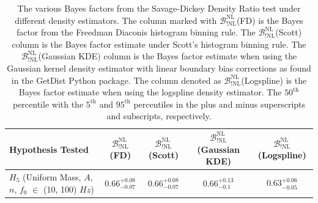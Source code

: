 \newpage
\begin{table}[ht]
\begin{adjustbox}{angle=90}
\begin{tabularx}{1.0\textwidth}{l c c c c}
\hline\hline
 Hypothesis Tested  & $\mathcal{B}^{\mathrm{NL}}_{\mathrm{!NL}}$(FD)  & $\mathcal{B}^{\mathrm{NL}}_{\mathrm{!NL}}$(Scott) & $\mathcal{B}^{\mathrm{NL}}_{\mathrm{!NL}}$(Gaussian KDE) & $\mathcal{B}^{\mathrm{NL}}_{\mathrm{!NL}}$(Logspline)\\
\hline\hline
$H_5$ (Uniform Mass, $A$, $n$, $f_0$ $\in$ (10, 100) $Hz$) &
$0.66^{+0.08}_{-0.07}$ & $0.66^{+0.08}_{-0.07}$ & $0.66^{+0.13}_{-0.1}$ & $0.63^{+0.06}_{-0.05}$ \\
\hline\hline
\end{tabularx}
\end{adjustbox}
\caption{The various Bayes factors from the Savage-Dickey Density Ratio test under different density estimators. The column marked with $\mathcal{B}^{\mathrm{NL}}_{\mathrm{!NL}}$(FD) is the Bayes factor from the Freedman Diaconis histogram binning rule. The $\mathcal{B}^{\mathrm{NL}}_{\mathrm{!NL}}$(Scott) column is the Bayes factor estimate under Scott's histogram binning rule. The $\mathcal{B}^{\mathrm{NL}}_{\mathrm{!NL}}$(Gaussian KDE) column is the Bayes factor estimate when using the Gaussian kernel density estimator with linear boundary bias corrections as found in the GetDist Python package. The column denoted as  $\mathcal{B}^{\mathrm{NL}}_{\mathrm{!NL}}$(Logspline) is the Bayes factor estimate when using the logspline density estimator. The $50^{\mathrm{th}}$ percentile with the $5^{\mathrm{th}}$ and $95^{\mathrm{th}}$ percentiles in the plus and minus superscripts and subscripts, respectively.}\label{table:Bayes_sddr}
\end{table}


